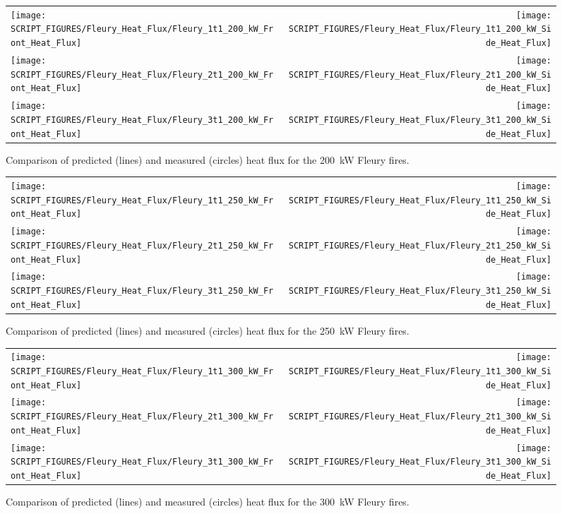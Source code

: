 \begin{figure}[p]
\begin{tabular*}{\textwidth}{l@{\extracolsep{\fill}}r}
\texttt{[image: SCRIPT\_FIGURES/Fleury\_Heat\_Flux/Fleury\_1t1\_200\_kW\_Front\_Heat\_Flux]} &
\texttt{[image: SCRIPT\_FIGURES/Fleury\_Heat\_Flux/Fleury\_1t1\_200\_kW\_Side\_Heat\_Flux]} \\
\texttt{[image: SCRIPT\_FIGURES/Fleury\_Heat\_Flux/Fleury\_2t1\_200\_kW\_Front\_Heat\_Flux]} &
\texttt{[image: SCRIPT\_FIGURES/Fleury\_Heat\_Flux/Fleury\_2t1\_200\_kW\_Side\_Heat\_Flux]} \\
\texttt{[image: SCRIPT\_FIGURES/Fleury\_Heat\_Flux/Fleury\_3t1\_200\_kW\_Front\_Heat\_Flux]} &
\texttt{[image: SCRIPT\_FIGURES/Fleury\_Heat\_Flux/Fleury\_3t1\_200\_kW\_Side\_Heat\_Flux]}
\end{tabular*}
\label{Fleury_Heat_Flux_200_kW}
\caption[Fleury Heat Flux, 200 kW fires.]
{Comparison of predicted (lines) and measured (circles) heat flux for the 200~kW Fleury fires.}
\end{figure}

\begin{figure}[p]
\begin{tabular*}{\textwidth}{l@{\extracolsep{\fill}}r}
\texttt{[image: SCRIPT\_FIGURES/Fleury\_Heat\_Flux/Fleury\_1t1\_250\_kW\_Front\_Heat\_Flux]} &
\texttt{[image: SCRIPT\_FIGURES/Fleury\_Heat\_Flux/Fleury\_1t1\_250\_kW\_Side\_Heat\_Flux]} \\
\texttt{[image: SCRIPT\_FIGURES/Fleury\_Heat\_Flux/Fleury\_2t1\_250\_kW\_Front\_Heat\_Flux]} &
\texttt{[image: SCRIPT\_FIGURES/Fleury\_Heat\_Flux/Fleury\_2t1\_250\_kW\_Side\_Heat\_Flux]} \\
\texttt{[image: SCRIPT\_FIGURES/Fleury\_Heat\_Flux/Fleury\_3t1\_250\_kW\_Front\_Heat\_Flux]} &
\texttt{[image: SCRIPT\_FIGURES/Fleury\_Heat\_Flux/Fleury\_3t1\_250\_kW\_Side\_Heat\_Flux]}
\end{tabular*}
\label{Fleury_Heat_Flux_250_kW}
\caption[Fleury Heat Flux, 250 kW fires.]
{Comparison of predicted (lines) and measured (circles) heat flux for the 250~kW Fleury fires.}
\end{figure}

\begin{figure}[p]
\begin{tabular*}{\textwidth}{l@{\extracolsep{\fill}}r}
\texttt{[image: SCRIPT\_FIGURES/Fleury\_Heat\_Flux/Fleury\_1t1\_300\_kW\_Front\_Heat\_Flux]} &
\texttt{[image: SCRIPT\_FIGURES/Fleury\_Heat\_Flux/Fleury\_1t1\_300\_kW\_Side\_Heat\_Flux]} \\
\texttt{[image: SCRIPT\_FIGURES/Fleury\_Heat\_Flux/Fleury\_2t1\_300\_kW\_Front\_Heat\_Flux]} &
\texttt{[image: SCRIPT\_FIGURES/Fleury\_Heat\_Flux/Fleury\_2t1\_300\_kW\_Side\_Heat\_Flux]} \\
\texttt{[image: SCRIPT\_FIGURES/Fleury\_Heat\_Flux/Fleury\_3t1\_300\_kW\_Front\_Heat\_Flux]} &
\texttt{[image: SCRIPT\_FIGURES/Fleury\_Heat\_Flux/Fleury\_3t1\_300\_kW\_Side\_Heat\_Flux]}
\end{tabular*}
\label{Fleury_Heat_Flux_300_kW}
\caption[Fleury Heat Flux, 300 kW fires.]
{Comparison of predicted (lines) and measured (circles) heat flux for the 300~kW Fleury fires.}
\end{figure}

